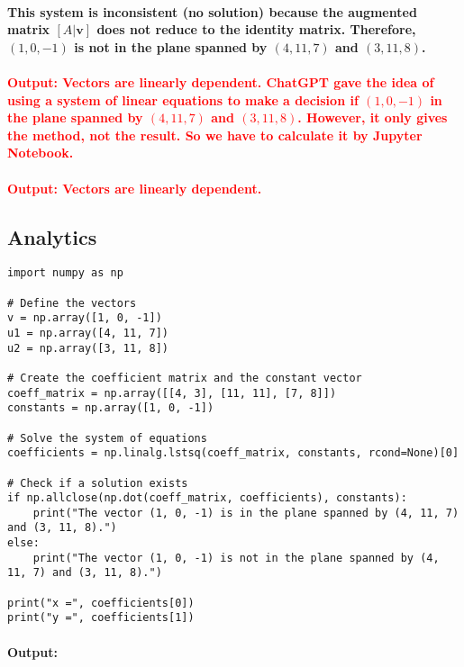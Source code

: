 \documentclass[11pt]{article} %
\begin{document}
\begin{mdframed}
    \paragraph{This system is inconsistent (no solution) because the augmented matrix \([A | \mathbf{v}]\) does not reduce to the identity matrix. Therefore, \( (1, 0, -1) \) is not in the plane spanned by \( (4, 11, 7) \) and \( (3, 11, 8) \).}
    \paragraph{\textcolor{red}{Output: Vectors are linearly dependent. ChatGPT gave the idea of using a system of linear equations to make a decision if $ (1,0,-1)$ in the plane spanned by $ (4,11,7)$ and $ (3,11,8)$. However, it only gives the method, not the result. So we have to calculate it by Jupyter Notebook.}}
    \paragraph{\textcolor{red}{Output: Vectors are linearly dependent.}}
\end{mdframed}
% 
% 
% 
% 
\subsection{Analytics}
\begin{lstlisting}[style=pystyle]
import numpy as np

# Define the vectors
v = np.array([1, 0, -1])
u1 = np.array([4, 11, 7])
u2 = np.array([3, 11, 8])

# Create the coefficient matrix and the constant vector
coeff_matrix = np.array([[4, 3], [11, 11], [7, 8]])
constants = np.array([1, 0, -1])

# Solve the system of equations
coefficients = np.linalg.lstsq(coeff_matrix, constants, rcond=None)[0]

# Check if a solution exists
if np.allclose(np.dot(coeff_matrix, coefficients), constants):
    print("The vector (1, 0, -1) is in the plane spanned by (4, 11, 7) and (3, 11, 8).")
else:
    print("The vector (1, 0, -1) is not in the plane spanned by (4, 11, 7) and (3, 11, 8).")

print("x =", coefficients[0])
print("y =", coefficients[1])
\end{lstlisting}
\paragraph{\textbf{Output:}}
\end{document}
